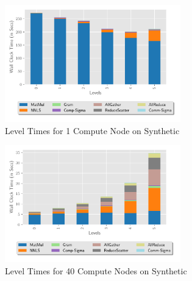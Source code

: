 
\begin{figure}
\begin{center}
\includegraphics[height=2in, width=\columnwidth]{plots/synthetic_sequential_level_breakdown.pdf}
\caption{Level Times for 1 Compute Node on Synthetic}
\label{fig:seqlevelbreakdown}
\end{center}
\end{figure}

\begin{figure}
\begin{center}
\includegraphics[height=2in, width=\columnwidth]{plots/synthetic_parallel_level_breakdown.pdf}
\caption{Level Times for 40 Compute Nodes on Synthetic}
\label{fig:parallellevelbreakdown}
\end{center}
\end{figure}




